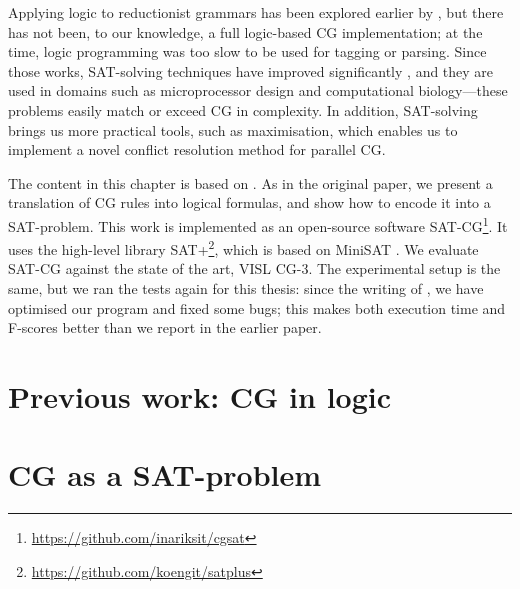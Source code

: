 
Applying logic to reductionist grammars has been explored earlier by \cite{lager98,lager_nivre01}, but there has not been, to our knowledge, a full logic-based CG implementation; at the time, logic programming was too slow to be used for tagging or parsing. 
Since those works, SAT-solving techniques have improved significantly \cite{marques_silva2010}, and they are used in domains such as microprocessor design and computational 
biology---these problems easily match or exceed CG in complexity. 
In addition, SAT-solving brings us more practical tools, such as maximisation, which enables us to implement a novel conflict resolution method for parallel CG.


The content in this chapter is based on \cite{listenmaa_claessen2015}.
As in the original paper, we present a translation of CG rules into logical formulas, and show how to encode it into a SAT-problem.
This work is implemented as an open-source software SAT-CG\footnote{\url{https://github.com/inariksit/cgsat}}. It uses the high-level library SAT+\footnote{\url{https://github.com/koengit/satplus}}, which is based on MiniSAT \cite{een04sat}.
We evaluate SAT-CG against the state of the art, VISL CG-3.
The experimental setup is the same, but we ran the tests again for this thesis: since the writing of  \cite{listenmaa_claessen2015}, we have optimised our program and fixed some bugs; this 
makes both execution time and F-scores better than we report in the earlier paper. 


\section{Previous work: CG in logic}\label{encoding-in-logic}




\section{CG as a SAT-problem}
\label{sec:CGSAT}

